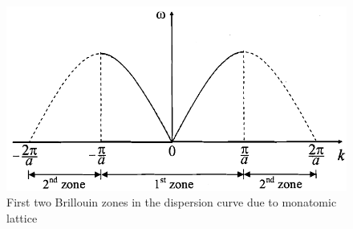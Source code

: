 \documentclass[%
 aip,
 amsmath,amssymb,
 reprint, floatfix%
]{revtex4-1}
\begin{document}
    \begin{figure}
        \centering
        \includegraphics[scale = 0.45]{Figures/first2brillouin.png}
        \caption{First two Brillouin zones in the dispersion curve due to monatomic lattice}
        \label{fig:f2zones}
    \end{figure}
    \par
\end{document}
